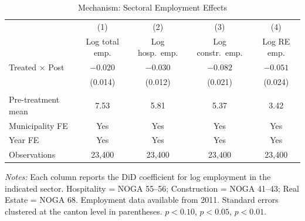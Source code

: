 \begin{table}[H]
\centering
\caption{Mechanism: Sectoral Employment Effects}
\label{tab:mechanism}
\begin{threeparttable}
\begin{tabular}{lcccc}
\toprule
& (1) & (2) & (3) & (4) \\
& Log total emp. & Log hosp.\ emp. & Log constr.\ emp. & Log RE emp. \\
\midrule
Treated $\times$ Post & $-0.020$ & $-0.030$\sym{**} & $-0.082$\sym{***} & $-0.051$\sym{**} \\
                       & (0.014) & (0.012) & (0.021) & (0.024) \\
\\
Pre-treatment mean & 7.53 & 5.81 & 5.37 & 3.42 \\
Municipality FE & Yes & Yes & Yes & Yes \\
Year FE & Yes & Yes & Yes & Yes \\
Observations & 23{,}400 & 23{,}400 & 23{,}400 & 23{,}400 \\
\bottomrule
\end{tabular}
\begin{tablenotes}[flushleft]
\small
\item \textit{Notes:} Each column reports the DiD coefficient for log employment in the indicated sector. Hospitality = NOGA 55--56; Construction = NOGA 41--43; Real Estate = NOGA 68. Employment data available from 2011. Standard errors clustered at the canton level in parentheses. \sym{*} $p<0.10$, \sym{**} $p<0.05$, \sym{***} $p<0.01$.
\end{tablenotes}
\end{threeparttable}
\end{table}
